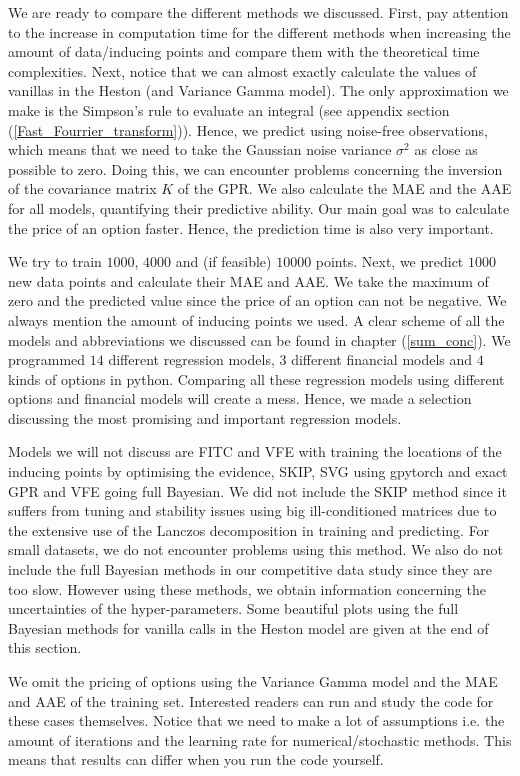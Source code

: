 \documentclass[12pt,a4paper,oneside]{book}
\begin{document}
We are ready to compare the different methods we discussed. First, pay attention to the increase in computation time for the different methods when increasing the amount of data/inducing points and compare them with the theoretical time complexities. Next, notice that we can almost exactly calculate the values of vanillas in the Heston (and Variance Gamma model). The only approximation we make is the Simpson's rule to evaluate an integral (see appendix section (\ref{Fast_Fourrier_transform})). Hence, we predict using noise-free observations, which means that we need to take the Gaussian noise variance $\sigma^2$ as close as possible to zero. Doing this, we can encounter problems concerning the inversion of the covariance matrix $K$ of the GPR. We also calculate the MAE and the AAE for all models, quantifying their predictive ability. Our main goal was to calculate the price of an option faster. Hence, the prediction time is also very important. 


We try to train $1000$, $4000$ and (if feasible) $10000$ points. Next, we predict $1000$ new data points and calculate their MAE and AAE. We take the maximum of zero and the predicted value since the price of an option can not be negative. We always mention the amount of inducing points we used. A clear scheme of all the models and abbreviations we discussed can be found in chapter (\ref{sum_conc}). We programmed $14$ different regression models, $3$ different financial models and $4$ kinds of options in python. Comparing all these regression models using different options and financial models will create a mess. Hence, we made a selection discussing the most promising and important regression models.

Models we will not discuss are FITC and VFE with training the locations of the inducing points by optimising the evidence, SKIP, SVG using gpytorch and exact GPR and VFE going full Bayesian. We did not include the SKIP method since it suffers from tuning and stability issues using big ill-conditioned matrices due to the extensive use of the Lanczos decomposition in training and predicting. For small datasets, we do not encounter problems using this method. We also do not include the full Bayesian methods in our competitive data study since they are too slow. However using these methods, we obtain information concerning the uncertainties of the hyper-parameters. Some beautiful plots using the full Bayesian methods for vanilla calls in the Heston model are given at the end of this section.  

We omit the pricing of options using the Variance Gamma model and the MAE and AAE of the training set. Interested readers can run and study the code for these cases themselves. Notice that we need to make a lot of assumptions i.e. the amount of iterations and the learning rate for numerical/stochastic methods. This means that results can differ when you run the code yourself.
\end{document}
